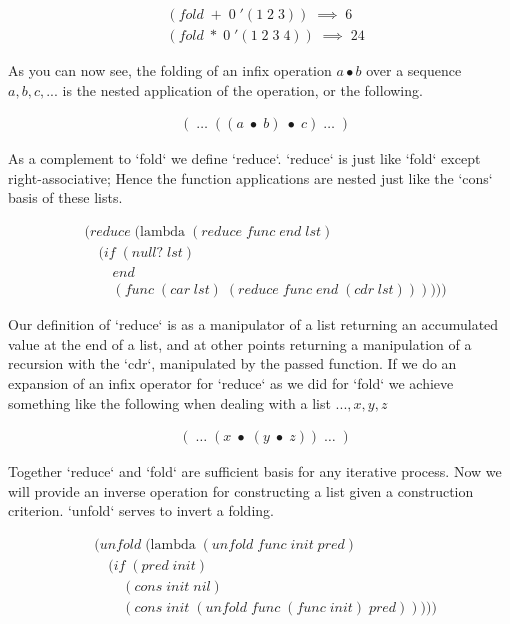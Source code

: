 \begin{align*}
& (fold \; + \; 0 \; '(1 \; 2 \; 3)) \; \implies \; 6
\\& (fold \; * \; 0 \; '(1 \; 2 \; 3 \; 4)) \; \implies \; 24
\end{align*}

As you can now see, the folding of an infix operation $a \bullet b$ over a 
sequence $a, b, c, ...$ is the nested application of the operation, or the 
following.

\begin{align*}
& ( \; \dots \; ((a \; \bullet \; b) \; \bullet \; c) \; \dots \; )
\end{align*}

As a complement to `fold` we define `reduce`. `reduce` is just like `fold` except 
right-associative; Hence the function applications are nested just like the `cons` 
basis of these lists.

\begin{align*}
& (reduce \; (\text{lambda} \; (reduce \; func \; end \; lst)
\\& \quad (if \; (null? \; lst)
\\& \qquad end
\\& \qquad (func \; (car \; lst) \; (reduce \; func \; end \; (cdr \; lst))))))
\end{align*}

Our definition of `reduce` is as a manipulator of a list returning an accumulated 
value at the end of a list, and at other points returning a manipulation of a 
recursion with the `cdr`, manipulated by the passed function. If we do an 
expansion of an infix operator for `reduce` as we did for `fold` we achieve 
something like the following when dealing with a list $... , x, y, z$

\begin{align*}
& ( \; \dots \; (x \; \bullet \; (y \; \bullet \; z)) \; \dots \; )
\end{align*}

Together `reduce` and `fold` are sufficient basis for any iterative process. Now 
we will provide an inverse operation for constructing a list given a construction 
criterion. `unfold` serves to invert a folding.

\begin{align*}
& (unfold \; (\text{lambda} \; (unfold \; func \; init \; pred)
\\& \quad (if \; (pred \; init)
\\& \qquad (cons \; init \; nil)
\\& \qquad (cons \; init \; (unfold \; func \; (func \; init) \; pred)))))
\end{align*}

